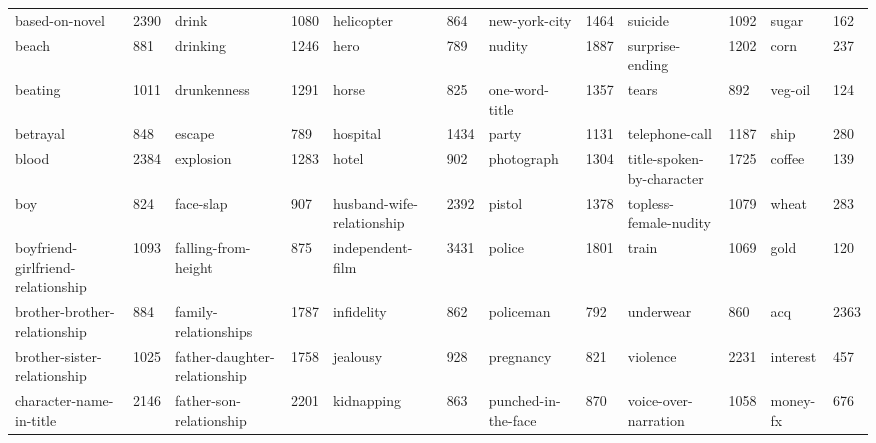 \begin{landscape}
\begin{table}[]
\begin{tabular}{llllllllllll}
		based-on-novel                    & 2390      & drink                        & 1080      & helicopter                 & 864       & new-york-city                & 1464      & suicide                   & 1092      & sugar        & 162       \\
		beach                             & 881       & drinking                     & 1246      & hero                       & 789       & nudity                       & 1887      & surprise-ending           & 1202      & corn         & 237       \\
		beating                           & 1011      & drunkenness                  & 1291      & horse                      & 825       & one-word-title               & 1357      & tears                     & 892       & veg-oil      & 124       \\
		betrayal                          & 848       & escape                       & 789       & hospital                   & 1434      & party                        & 1131      & telephone-call            & 1187      & ship         & 280       \\
		blood                             & 2384      & explosion                    & 1283      & hotel                      & 902       & photograph                   & 1304      & title-spoken-by-character & 1725      & coffee       & 139       \\
		boy                               & 824       & face-slap                    & 907       & husband-wife-relationship  & 2392      & pistol                       & 1378      & topless-female-nudity     & 1079      & wheat        & 283       \\
		boyfriend-girlfriend-relationship & 1093      & falling-from-height          & 875       & independent-film           & 3431      & police                       & 1801      & train                     & 1069      & gold         & 120       \\
		brother-brother-relationship      & 884       & family-relationships         & 1787      & infidelity                 & 862       & policeman                    & 792       & underwear                 & 860       & acq          & 2363      \\
		brother-sister-relationship       & 1025      & father-daughter-relationship & 1758      & jealousy                   & 928       & pregnancy                    & 821       & violence                  & 2231      & interest     & 457       \\
		character-name-in-title           & 2146      & father-son-relationship      & 2201      & kidnapping                 & 863       & punched-in-the-face          & 870       & voice-over-narration      & 1058      & money-fx     & 676       \\

\end{tabular}
\end{table}
\end{landscape}
